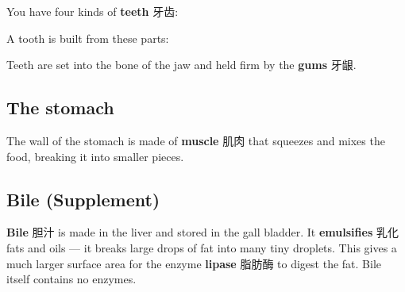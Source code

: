 \documentclass[11pt]{article}
\begin{document}
You have four kinds of \textbf{teeth} 牙齿:

\begin{center}
\end{center}

A tooth is built from these parts:

\begin{center}
\end{center}

Teeth are set into the bone of the jaw and held firm by the \textbf{gums} 牙龈.

\subsection*{The stomach}

The wall of the stomach is made of \textbf{muscle} 肌肉 that squeezes and mixes the food, breaking it into smaller pieces.

\subsection*{Bile (Supplement)}

\textbf{Bile} 胆汁 is made in the liver and stored in the gall bladder. It \textbf{emulsifies} 乳化 fats and oils — it breaks large drops of fat into many tiny droplets. This gives a much larger surface area for the enzyme \textbf{lipase} 脂肪酶 to digest the fat. Bile itself contains no enzymes.
\end{document}
